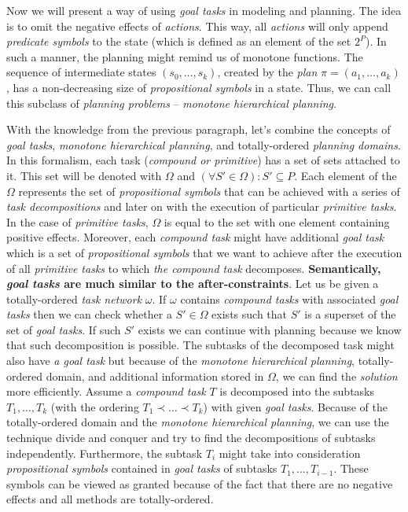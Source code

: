 \medskip\noindent
Now we will present a way of using \emph{goal tasks} in modeling and planning. The idea is to omit the negative effects of \emph{actions}. This way, all \emph{actions} will only append \emph{predicate symbols} to the state (which is defined as an element of the set $2^P$). In such a manner, the planning might remind us of monotone functions. The sequence of intermediate states $(s_0, \dots, s_k)$, created by the \emph{plan} $\pi = (a_1, \dots, a_k)$, has a non-decreasing size of \emph{propositional symbols} in a state. Thus, we can call this subclass of \emph{planning problems} – \emph{monotone hierarchical planning}.

\medskip\noindent
With the knowledge from the previous paragraph, let's combine the concepts of \emph{goal tasks}, \emph{monotone hierarchical planning}, and totally-ordered \emph{planning domains}. In this formalism, each task (\emph{compound or primitive}) has a set of sets attached to it. This set will be denoted with $\Omega$ and $(\forall S' \in \Omega): S' \subseteq P$. Each element of the $\Omega$ represents the set of \emph{propositional symbols} that can be achieved with a series of \emph{task decompositions} and later on with the execution of particular \emph{primitive tasks}. In the case of \emph{primitive tasks}, $\Omega$ is equal to the set with one element containing positive effects. Moreover, each \emph{compound task} might have additional \emph{goal task} which is a set of \emph{propositional symbols} that we want to achieve after the execution of all \emph{primitive tasks} to which \emph{the compound task} decomposes. \textbf{Semantically, \emph{goal tasks} are much similar to the after-constraints}. Let us be given a totally-ordered \emph{task network} $\omega$. If $\omega$ contains \emph{compound tasks} with associated \emph{goal tasks} then we can check whether a $S' \in \Omega$ exists such that $S'$ is a superset of the set of \emph{goal tasks}. If such $S'$ exists we can continue with planning because we know that such decomposition is possible. The subtasks of the decomposed task might also have \emph{a goal task} but because of the \emph{monotone hierarchical planning}, totally-ordered domain, and additional information stored in $\Omega$, we can find the \emph{solution} more efficiently. Assume a \emph{compound task} $T$ is decomposed into the subtasks $T_1, \dots, T_k$ (with the ordering  $T_1 \prec \dots \prec T_k$) with given \emph{goal tasks}. Because of the totally-ordered domain and the \emph{monotone hierarchical planning}, we can use the technique divide and conquer and try to find the decompositions of subtasks independently. Furthermore, the subtask $T_i$ might take into consideration \emph{propositional symbols} contained in \emph{goal tasks} of subtasks $T_1, \dots, T_{i - 1}$. These symbols can be viewed as granted because of the fact that there are no negative effects and all methods are totally-ordered.